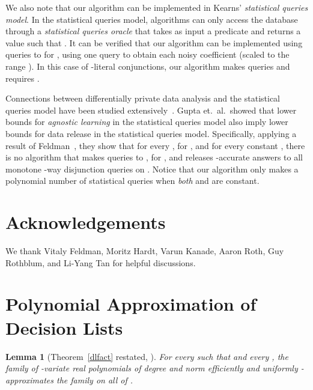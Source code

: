 \documentclass[11pt]{article}
\newtheorem{lemma}[theorem]{Lemma}
\theoremstyle{definition}
\begin{document}
We also note that our algorithm can be implemented in Kearns' \emph{statistical queries model}.  In the statistical queries model, algorithms can only access the database through a \emph{statistical queries oracle}  that takes as input a predicate  and returns a value  such that .  It can be verified that our algorithm can be implemented using  queries to  for , using one query to obtain each noisy coefficient (scaled to the range ).  In this case of -literal conjunctions, our algorithm makes  queries and requires .

Connections between differentially private data analysis and the statistical queries model have been studied extensively~\cite{BlumDwMcNi05, KasiviswanathanLeNiRaSm07, GuptaHaRoUl11}.  Gupta et.~al.~showed that lower bounds for \emph{agnostic learning} in the statistical queries model also imply lower bounds for data release in the statistical queries model.  Specifically, applying a result of Feldman~\cite{Feldman09}, they show that for every , for , and for every constant , there is no algorithm that makes  queries to , for , and releases -accurate answers to all monotone -way disjunction queries on .  Notice that our algorithm only makes a polynomial number of statistical queries when \emph{both}  and  are constant.

\else
\fi

\section*{Acknowledgements}

We thank Vitaly Feldman, Moritz Hardt, Varun Kanade, Aaron Roth, Guy Rothblum, and Li-Yang Tan for helpful discussions.



\appendix




\ifnum{}
\section{Polynomial Approximation of Decision Lists}
\label{app:dlfact}
\begin{lemma}[Theorem~\ref{dlfact} restated, \cite{KlivansSe04}]  For every  such that  and every , the family  of -variate real polynomials of degree  and norm  efficiently and uniformly -approximates the family  on all of .
\end{lemma}
\end{document}
